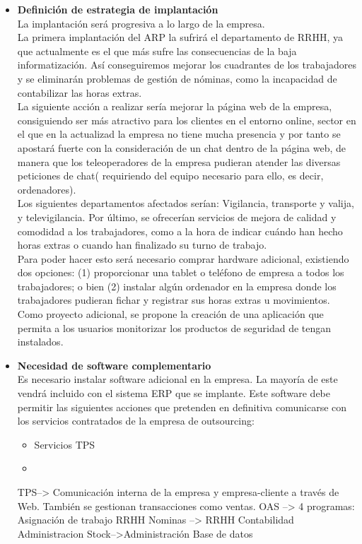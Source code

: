 \documentclass[12pt,letterpaper]{article}
\begin{document}
\begin{itemize}
	 		 \item \textbf{Definición de estrategia de implantación}\\
	  La implantación será progresiva a lo largo de la empresa.\\ La primera implantación del ARP la sufrirá el departamento de RRHH, ya que actualmente es el que más sufre las consecuencias de la baja informatización. Así conseguiremos mejorar los cuadrantes de los trabajadores y se eliminarán problemas de gestión de nóminas, como la incapacidad de contabilizar las horas extras.\\ La siguiente acción a realizar sería mejorar la página web de la empresa, consiguiendo ser más atractivo para los clientes en el entorno online, sector en el que en la actualizad la empresa  no tiene mucha presencia y por tanto se apostará fuerte con la consideración de un chat dentro de la página web, de manera que los teleoperadores de la empresa pudieran atender las diversas peticiones de chat( requiriendo del equipo necesario para ello, es decir, ordenadores).\\
	  
	  Los siguientes departamentos afectados serían: Vigilancia, transporte y valija, y televigilancia. Por último, se ofrecerían servicios de mejora de calidad y comodidad a los trabajadores, como a la hora de indicar cuándo han hecho horas extras o cuando han finalizado su turno de trabajo.\\ Para poder hacer esto será necesario comprar hardware adicional, existiendo dos opciones: (1) proporcionar una tablet o teléfono de empresa a todos los trabajadores; o bien (2) instalar algún ordenador en la empresa donde los trabajadores pudieran fichar y registrar sus horas extras u movimientos.\\ Como proyecto adicional, se propone la creación de una aplicación que permita a los usuarios monitorizar los productos de seguridad de tengan instalados.
	  
	  		\item \textbf{Necesidad de software complementario}\\
	  Es necesario instalar software adicional en la empresa. La mayoría de este vendrá incluido con el sistema ERP que se implante. Este software debe permitir las siguientes acciones que pretenden en definitiva comunicarse con los servicios contratados de la empresa de outsourcing:
	  \begin{itemize}
	  	\item Servicios TPS
	  	\item
	  \end{itemize}
	  
	  TPS--> Comunicación interna de la empresa y empresa-cliente a través de Web. También se gestionan transacciones como ventas.
	  OAS --> 4 programas: Asignación de trabajo RRHH
	                       Nominas --> RRHH
	                       Contabilidad Administracion
	                       Stock-->Administración
	  Base de datos 
	          
	  	\end{itemize} 
	
\end{document}
